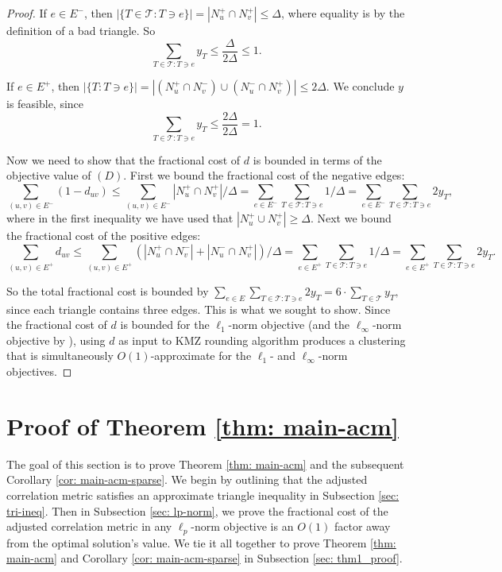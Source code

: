 \documentclass[11pt]{article}
\begin{document}
\begin{proof}
If $e \in E^-$, then $|\{T \in \mathcal{T}: T \ni e\}| = |N_u^+ \cap N_v^+| \leq \Delta$, where equality is by the definition of a bad triangle. So 
\[\sum_{T \in \mathcal{T}: T \ni e} y_T  \leq \frac{\Delta}{2\Delta} \leq 1.\]


If $e \in E^+$, then $|\{T : T \ni e\}| = |(N_u^+ \cap N_v^-) \cup (N_u^- \cap N_v^+)| \leq 2\Delta$. We conclude $y$ is feasible, since
\[\sum_{T \in \mathcal{T}: T \ni e} y_T  \leq \frac{2\Delta}{2\Delta} = 1.\]
 

Now we need to show that the fractional cost of $d$ is bounded in terms of the objective value of $(D)$. First we bound the fractional cost of the negative edges:
\[\sum_{(u,v) \in E^-}(1-d_{uv}) \leq \sum_{(u,v)\in E^-} |N_u^+ \cap N_v^+|/\Delta= \sum_{e \in E^-} \sum_{T \in \mathcal{T}: T \ni e} 1/\Delta = \sum_{e \in E^-} \sum_{T \in \mathcal{T}: T \ni e} 2y_T,\]
where in the first inequality we have used that $|N_u^+ \cup N_v^+| \geq \Delta$. Next we bound the fractional cost of the positive edges:
\[\sum_{(u,v) \in E^+}d_{uv} \leq \sum_{(u,v)\in E^+} (|N_u^+ \cap N_v^-| + |N_u^- \cap N_v^+|)/\Delta = \sum_{e \in E^+} \sum_{T \in \mathcal{T}: T \ni e} 1/\Delta = \sum_{e \in E^+} \sum_{T \in \mathcal{T}: T \ni e} 2y_T. \]

So the total fractional cost is bounded by 
$\sum_{e \in E} \sum_{T \in \mathcal{T}: T \ni e} 2 y_T = 6 \cdot \sum_{T \in \mathcal{T}} y_T,$
since each triangle contains three edges. This is what we sought to show. Since the fractional cost of $d$ is bounded for the $\ell_1$-norm objective (and the $\ell_{\infty}$-norm objective by \cite{DMN23}), using $d$ as input to KMZ rounding algorithm produces a clustering that is simultaneously $O(1)$-approximate for the $\ell_1$- and $\ell_{\infty}$-norm objectives.  
\end{proof}



\section{Proof of Theorem \ref{thm: main-acm}}\label{sec: proofs}

The goal of this section is to prove Theorem \ref{thm: main-acm} and the subsequent Corollary 
\ref{cor: main-acm-sparse}.
We begin by outlining that the adjusted correlation metric satisfies an approximate triangle inequality in Subsection \ref{sec: tri-ineq}. 
Then in Subsection \ref{sec: lp-norm}, we prove the fractional cost of the adjusted correlation metric in any $\ell_p$-norm objective is an $O(1)$ factor away from the optimal solution's value.
We tie it all together to prove Theorem \ref{thm: main-acm} and Corollary 
\ref{cor: main-acm-sparse} in Subsection \ref{sec: thm1_proof}.
\end{document}
